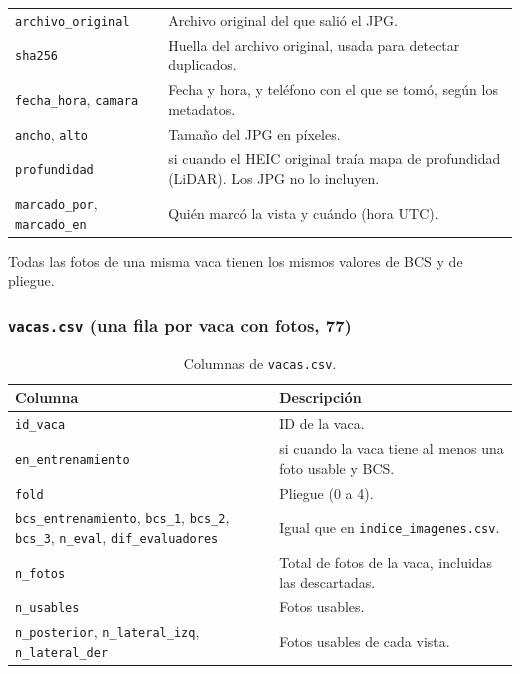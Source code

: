 \begin{table}[H]
\begin{tabularx}{\textwidth}{>{\raggedright\arraybackslash}p{}>{\raggedright\arraybackslash}X}
    \texttt{archivo\_original} & Archivo original del que salió el JPG. \\
    \texttt{sha256} & Huella del archivo original, usada para detectar duplicados. \\
    \texttt{fecha\_hora}, \texttt{camara} & Fecha y hora, y teléfono con el que se tomó, según los metadatos. \\
    \texttt{ancho}, \texttt{alto} & Tamaño del JPG en píxeles. \\
    \texttt{profundidad} & si cuando el HEIC original traía mapa de profundidad (LiDAR). Los JPG no lo incluyen. \\
    \texttt{marcado\_por}, \texttt{marcado\_en} & Quién marcó la vista y cuándo (hora UTC). \\
    \bottomrule
  \end{tabularx}
\end{table}

Todas las fotos de una misma vaca tienen los mismos valores de BCS y de pliegue.

\subsubsection*{\texttt{vacas.csv} (una fila por vaca con fotos, 77)}

\begin{table}[H]
  \centering
  \small
  \caption{Columnas de \texttt{vacas.csv}.}
  \label{tab:col-vacas}
  \begin{tabularx}{\textwidth}{>{\raggedright\arraybackslash}p{}>{\raggedright\arraybackslash}X}
    \toprule
    Columna & Descripción \\
    \midrule
    \texttt{id\_vaca} & ID de la vaca. \\
    \texttt{en\_entrenamiento} & si cuando la vaca tiene al menos una foto usable y BCS. \\
    \texttt{fold} & Pliegue (0 a 4). \\
    \texttt{bcs\_entrenamiento}, \texttt{bcs\_1}, \texttt{bcs\_2}, \texttt{bcs\_3}, \texttt{n\_eval}, \texttt{dif\_evaluadores} & Igual que en \texttt{indice\_imagenes.csv}. \\
    \texttt{n\_fotos} & Total de fotos de la vaca, incluidas las descartadas. \\
    \texttt{n\_usables} & Fotos usables. \\
    \texttt{n\_posterior}, \texttt{n\_lateral\_izq}, \texttt{n\_lateral\_der} & Fotos usables de cada vista. \\
    \bottomrule
  \end{tabularx}
\end{table}

